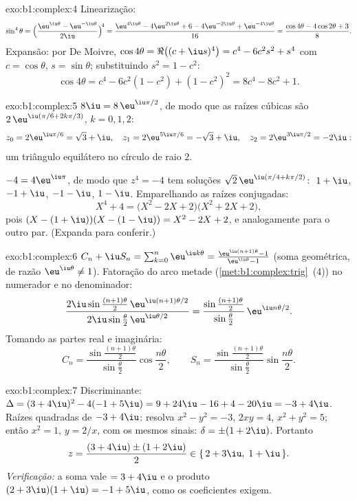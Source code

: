 \begin{solution}{exo:b1:complex:4}
Linearização:
\[
\sin^4\theta
= \Bigl(\frac{\eu^{\iu\theta} - \eu^{-\iu\theta}}{2\iu}\Bigr)^{\!4}
= \frac{\eu^{4\iu\theta} - 4\eu^{2\iu\theta} + 6 - 4\eu^{-2\iu\theta}
+ \eu^{-4\iu\theta}}{16}
= \frac{\cos 4\theta - 4\cos 2\theta + 3}{8}.
\]
Expansão: por De Moivre, $\cos 4\theta = \Re\bigl((c +
\iu s)^4\bigr) = c^4 - 6c^2 s^2 + s^4$ com $c = \cos\theta$, $s =
\sin\theta$; substituindo $s^2 = 1 - c^2$:
\[
\cos 4\theta = c^4 - 6c^2(1 - c^2) + (1 - c^2)^2
= 8c^4 - 8c^2 + 1 .
\]
\end{solution}

\begin{solution}{exo:b1:complex:5}
$8\iu = 8\,\eu^{\iu\pi/2}$, de modo que as raízes cúbicas são $2\,\eu^{\iu(\pi/6 +
2k\pi/3)}$, $k = 0, 1, 2$:
\[
z_0 = 2\eu^{\iu\pi/6} = \sqrt 3 + \iu,\quad
z_1 = 2\eu^{5\iu\pi/6} = -\sqrt 3 + \iu,\quad
z_2 = 2\eu^{3\iu\pi/2} = -2\iu :
\]
um triângulo equilátero no círculo de raio $2$.

$-4 = 4\eu^{\iu\pi}$, de modo que $z^4 = -4$ tem soluções $\sqrt 2\,
\eu^{\iu(\pi/4 + k\pi/2)}$: $\;1 + \iu$, $-1 + \iu$, $-1 - \iu$,
$1 - \iu$. Emparelhando as raízes conjugadas:
\[
X^4 + 4 = \bigl(X^2 - 2X + 2\bigr)\bigl(X^2 + 2X + 2\bigr),
\]
pois $(X - (1+\iu))(X - (1-\iu)) = X^2 - 2X + 2$, e analogamente para
o outro par. (Expanda para conferir.)
\end{solution}

\begin{solution}{exo:b1:complex:6}
$C_n + \iu S_n = \sum_{k=0}^{n} \eu^{\iu k\theta} =
\frac{\eu^{\iu(n+1)\theta} - 1}{\eu^{\iu\theta} - 1}$ (soma geométrica,
de razão $\eu^{\iu\theta} \neq 1$). Fatoração do arco metade
(\cref{met:b1:complex:trig}~(4)) no numerador e no denominador:
\[
\frac{2\iu\sin\frac{(n+1)\theta}{2}\, \eu^{\iu(n+1)\theta/2}}
{2\iu\sin\frac{\theta}{2}\, \eu^{\iu\theta/2}}
= \frac{\sin\frac{(n+1)\theta}{2}}{\sin\frac{\theta}{2}}\,
\eu^{\iu n\theta/2}.
\]
Tomando as partes real e imaginária:
\[
C_n = \frac{\sin\frac{(n+1)\theta}{2}}{\sin\frac{\theta}{2}}
\cos\frac{n\theta}{2},
\qquad
S_n = \frac{\sin\frac{(n+1)\theta}{2}}{\sin\frac{\theta}{2}}
\sin\frac{n\theta}{2}.
\]
\end{solution}

\begin{solution}{exo:b1:complex:7}
Discriminante: $\Delta = (3 + 4\iu)^2 - 4(-1 + 5\iu) = 9 + 24\iu - 16 +
4 - 20\iu = -3 + 4\iu$. Raízes quadradas de $-3 + 4\iu$: resolva $x^2 - y^2
= -3$, $2xy = 4$, $x^2 + y^2 = 5$; então $x^2 = 1$, $y = 2/x$, com os mesmos
sinais: $\delta = \pm(1 + 2\iu)$. Portanto
\[
z = \frac{(3 + 4\iu) \pm (1 + 2\iu)}{2}
\in \{\, 2 + 3\iu,\; 1 + \iu \,\}.
\]
\emph{Verificação:} a soma vale $= 3 + 4\iu$ e o produto $(2+3\iu)(1+\iu) = -1 +
5\iu$, como os coeficientes exigem.
\end{solution}

